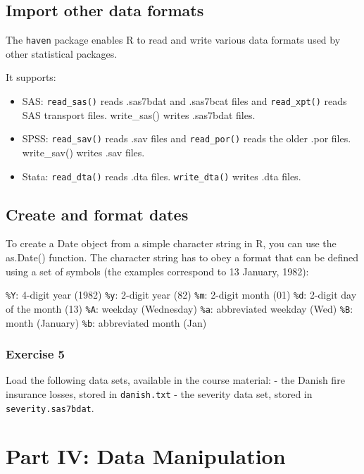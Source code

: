 \documentclass[
]{book}
\providecommand{\tightlist}{%
  \setlength{\itemsep}{0pt}\setlength{\parskip}{0pt}}
\begin{document}
\section*{Import other data formats}\label{import-other-data-formats}

The \texttt{haven} package enables R to read and write various data formats used by other statistical packages.

It supports:

\begin{itemize}
\tightlist
\item
  SAS: \texttt{read\_sas()} reads .sas7bdat and .sas7bcat files and \texttt{read\_xpt()} reads SAS transport files. write\_sas() writes .sas7bdat files.
\item
  SPSS: \texttt{read\_sav()} reads .sav files and \texttt{read\_por()} reads the older .por files. write\_sav() writes .sav files.
\item
  Stata: \texttt{read\_dta()} reads .dta files. \texttt{write\_dta()} writes .dta files.
\end{itemize}

\section{Create and format dates}\label{create-and-format-dates}

To create a Date object from a simple character string in R, you can use the as.Date() function. The character string has to obey a format that can be defined using a set of symbols (the examples correspond to 13 January, 1982):

\texttt{\%Y}: 4-digit year (1982)
\texttt{\%y}: 2-digit year (82)
\texttt{\%m}: 2-digit month (01)
\texttt{\%d}: 2-digit day of the month (13)
\texttt{\%A}: weekday (Wednesday)
\texttt{\%a}: abbreviated weekday (Wed)
\texttt{\%B}: month (January)
\texttt{\%b}: abbreviated month (Jan)

\subsection*{Exercise 5}\label{exercise-5}

Load the following data sets, available in the course material:
- the Danish fire insurance losses, stored in \texttt{danish.txt}
- the severity data set, stored in \texttt{severity.sas7bdat}.

\chapter*{Part IV: Data Manipulation}\label{part-iv-data-manipulation}
\end{document}
